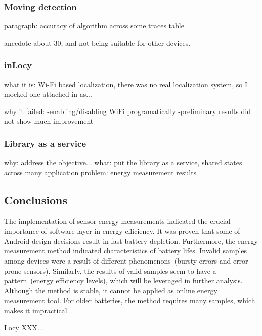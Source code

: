 	 

\subsubsection{Moving detection}
paragraph: accuracy of algorithm across some traces
	table
	
anecdote about 30, and not being suitable for other devices.

\subsubsection{inLocy}
what it is:
	Wi-Fi based localization, there was no real localization system, so I mocked one
	attached in as...

why it failed:
	-enabling/disabling WiFi programatically
	-preliminary results did not show much improvement

\subsubsection{Library as a service}
why: address the objective...
what: put the library as a service, shared states across many application
problem: energy measurement results	


\subsection{Conclusions}
The implementation of sensor energy measurements indicated the crucial importance of software layer in energy efficiency. It was proven that some of Android design decisions result in fast battery depletion. Furthermore, the energy measurement method indicated characteristics of battery lifes. Invalid samples among devices were a result of different phenomenons\ (bursty errors and error-prone sensors). Similarly, the results of valid samples seem to have a pattern\ (energy efficiency levels), which will be leveraged in further analysis. Although the method is stable, it cannot be applied as online energy measurement tool. For older batteries, the method requires many samples, which makes it impractical.

Locy XXX...